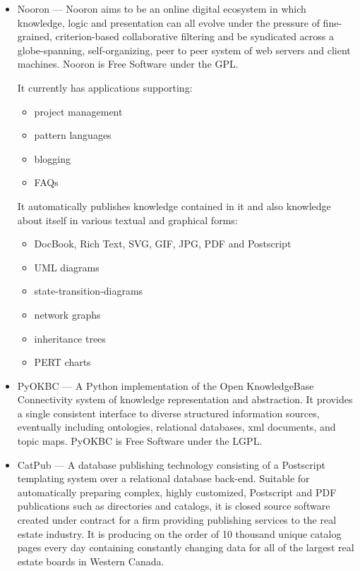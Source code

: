 \begin{resume}
\begin{position}
\begin{itemize}
  \item Nooron --- Nooron aims to be an online digital ecosystem in
    which knowledge, logic and presentation can all evolve under the
    pressure of fine-grained, criterion-based collaborative filtering 
    and be syndicated across a globe-spanning, self-organizing, 
    peer to peer system of web servers and client machines.
    Nooron is Free Software under the GPL.

    It currently has applications supporting:
       \begin{itemize}
          \item project management
	  \item pattern languages
          \item blogging
          \item FAQs
       \end{itemize}
     It automatically publishes knowledge contained in it and also
     knowledge about itself in various textual and graphical forms:
       \begin{itemize}
          \item DocBook, Rich Text, SVG, GIF, JPG, PDF and Postscript
	  \item UML diagrams
          \item state-transition-diagrams
          \item network graphs
          \item inheritance trees
          \item PERT charts
       \end{itemize}

  \item PyOKBC --- A Python implementation of the Open KnowledgeBase
  Connectivity system of knowledge representation and abstraction.  It
  provides a single consistent interface to diverse structured
  information sources, eventually including ontologies, relational databases,
  xml documents, and topic maps.  PyOKBC is Free Software under the LGPL.

  \item CatPub --- A database publishing technology consisting of a
  Postscript templating system over a relational database back-end.
  Suitable for automatically preparing complex, highly customized,
  Postscript and PDF publications such as directories and catalogs,
  it is closed source software created under contract for a firm
  providing publishing services to the real estate industry.  
  It is producing on the order of 10 thousand unique catalog pages 
  every day containing constantly changing data for all of the largest 
  real estate boards in Western Canada.


\end{itemize}
\end{position}
\end{resume}
